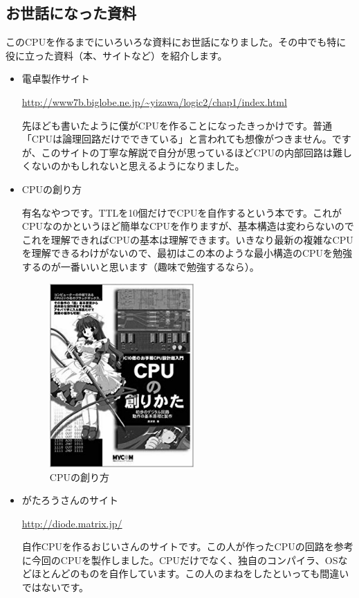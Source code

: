 \documentclass[11pt,b5paper,papersize,dvipdfmx]{jsbook}
\begin{document}
\subsection{お世話になった資料}
このCPUを作るまでにいろいろな資料にお世話になりました。その中でも特に役に立った資料（本、サイトなど）を紹介します。\par
\begin{itemize}
    \item 電卓製作サイト\par
        \url{http://www7b.biglobe.ne.jp/~yizawa/logic2/chap1/index.html}\par
        先ほども書いたように僕がCPUを作ることになったきっかけです。普通「CPUは論理回路だけでできている」と言われても想像がつきません。ですが、このサイトの丁寧な解説で自分が思っているほどCPUの内部回路は難しくないのかもしれないと思えるようになりました。
    \item CPUの創り方\par
    有名なやつです。TTLを10個だけでCPUを自作するという本です。これがCPUなのかというほど簡単なCPUを作りますが、基本構造は変わらないのでこれを理解できればCPUの基本は理解できます。いきなり最新の複雑なCPUを理解できるわけがないので、最初はこの本のような最小構造のCPUを勉強するのが一番いいと思います（趣味で勉強するなら）。
    \begin{figure}[H]
        \centering
        \includegraphics[width=5.5cm]{honda/img/51ATDABNHEL.png}
        \caption{CPUの創り方}
        \label{fig:how-to-create-cpu}
    \end{figure}
    \item がたろうさんのサイト\par
    \url{http://diode.matrix.jp/}\par
    自作CPUを作るおじいさんのサイトです。この人が作ったCPUの回路を参考に今回のCPUを製作しました。CPUだけでなく、独自のコンパイラ、OSなどほとんどのものを自作しています。この人のまねをしたといっても間違いではないです。
\end{itemize}
\end{document}
